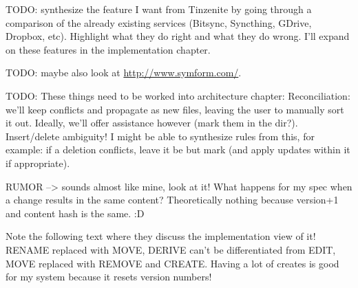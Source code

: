 TODO: synthesize the feature I want from Tinzenite by going through a comparison of the already existing services (Bitsync, Syncthing, GDrive, Dropbox, etc).
Highlight what they do right and what they do wrong.
I'll expand on these features in the implementation chapter.

TODO: maybe also look at \url{http://www.symform.com/}.

TODO: These things need to be worked into architecture chapter:
Reconciliation: we'll keep conflicts and propagate as new files, leaving the user to manually sort it out.
Ideally, we'll offer assistance however (mark them in the dir?).
Insert/delete ambiguity!
I might be able to synthesize rules from this, for example: if a deletion conflicts, leave it be but mark (and apply updates within it if appropriate).

RUMOR --> sounds almost like mine, look at it!
What happens for my spec when a change results in the same content?
Theoretically nothing because version+1 and content hash is the same. :D

Note the following text where they discuss the implementation view of it!
RENAME replaced with MOVE, DERIVE can't be differentiated from EDIT, MOVE replaced with REMOVE and CREATE.
Having a lot of creates is good for my system because it resets version numbers!
